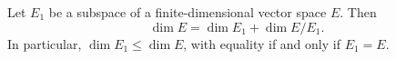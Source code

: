 Let $E_1$ be a subspace of a finite-dimensional vector space $E$. Then
$$\dim E = \dim E_1 + \dim E/E_1.$$
In particular, $\dim E_1 \leq \dim E$, with equality if and only if $E_1 = E$.

